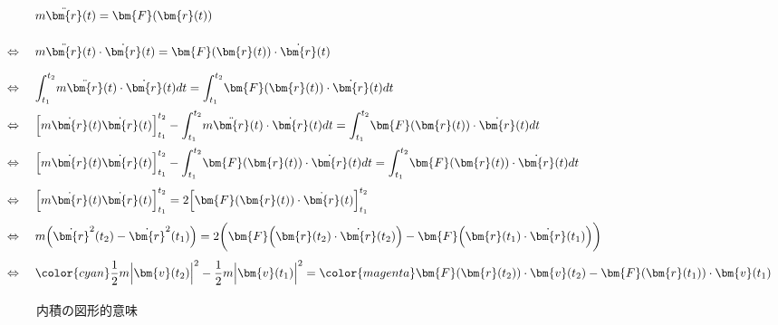 \documentclass[a4paper,11pt]{ltjsarticle}
\newcommand{\dint}[2]{\displaystyle{\int_{#1}^{#2}}}
\begin{document}
\begin{equation}
  \renewcommand{\arraystretch}{2.5}
  \begin{array}{rl}
    &\ m\ddot{\bm{r}}(t) = \bm{F}(\bm{r}(t))
    \\
    \Leftrightarrow
    &\ m\ddot{\bm{r}}(t) \cdot \dot{\bm{r}}(t) = \bm{F}(\bm{r}(t)) \cdot \dot{\bm{r}}(t)
    \\
    \Leftrightarrow
    &\ \dint{t_1}{t_2} m\ddot{\bm{r}}(t) \cdot \dot{\bm{r}}(t) dt = \dint{t_1}{t_2} \bm{F}(\bm{r}(t)) \cdot \dot{\bm{r}}(t) dt
    \\
    \Leftrightarrow
    &\ \Big[m\dot{\bm{r}}(t)\dot{\bm{r}}(t)\Big]_{t_1}^{t_2} - \dint{t_1}{t_2} m\ddot{\bm{r}}(t) \cdot \dot{\bm{r}}(t) dt = \dint{t_1}{t_2} \bm{F}(\bm{r}(t)) \cdot \dot{\bm{r}}(t) dt
    \\
    \Leftrightarrow
    &\ \Big[m\dot{\bm{r}}(t)\dot{\bm{r}}(t)\Big]_{t_1}^{t_2} - \dint{t_1}{t_2} \bm{F}(\bm{r}(t)) \cdot \dot{\bm{r}}(t) dt = \dint{t_1}{t_2} \bm{F}(\bm{r}(t)) \cdot \dot{\bm{r}}(t) dt
    \\
    \Leftrightarrow
    &\ \Big[m\dot{\bm{r}}(t)\dot{\bm{r}}(t)\Big]_{t_1}^{t_2} = 2\Big[\bm{F}(\bm{r}(t)) \cdot \dot{\bm{r}}(t)\Big]_{t_1}^{t_2}
    \\
    \Leftrightarrow
    &\ m\Big(\dot{\bm{r}}^2(t_2) - \dot{\bm{r}}^2(t_1)\Big) = 2\bigg(\bm{F}\Big(\bm{r}(t_2) \cdot \dot{\bm{r}}(t_2)\Big) - \bm{F}\Big(\bm{r}(t_1) \cdot \dot{\bm{r}}(t_1)\Big)\bigg)
    \\
    \Leftrightarrow
    &\ {\color{cyan}\dfrac{1}{2}m\Big|\bm{v}(t_2)\Big|^2 - \dfrac{1}{2}m\Big|\bm{v}(t_1)\Big|^2} = {\color{magenta}\bm{F}(\bm{r}(t_2)) \cdot \bm{v}(t_2) - \bm{F}(\bm{r}(t_1)) \cdot \bm{v}(t_1)}
  \end{array}
\end{equation}

\clearpage

\begin{figure}
\centering
{}
\caption{内積の図形的意味}
\end{figure}
\end{document}
